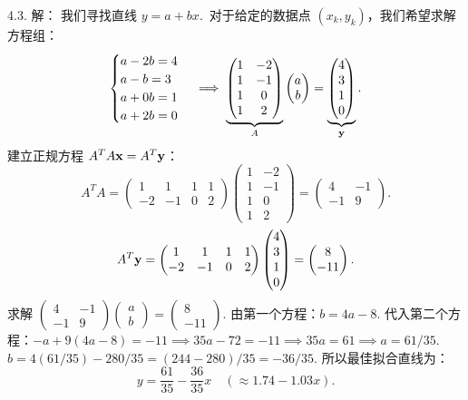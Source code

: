 \begin{exer}
4.3. 解：
我们寻找直线 $y = a + bx$.~对于给定的数据点 $(x_k, y_k)$，我们希望求解方程组：
$$
\begin{cases}
a - 2b = 4 \\
a - b = 3 \\
a + 0b = 1 \\
a + 2b = 0
\end{cases}
\implies \underbrace{\begin{pmatrix} 1 & -2 \\ 1 & -1 \\ 1 & 0 \\ 1 & 2 \end{pmatrix}}_{A} \begin{pmatrix} a \\ b \end{pmatrix} = \underbrace{\begin{pmatrix} 4 \\ 3 \\ 1 \\ 0 \end{pmatrix}}_{\mathbf{y}}.
$$
建立正规方程 $A^T A \mathbf{x} = A^T \mathbf{y}$：
$$ A^T A = \begin{pmatrix} 1 & 1 & 1 & 1 \\ -2 & -1 & 0 & 2 \end{pmatrix} \begin{pmatrix} 1 & -2 \\ 1 & -1 \\ 1 & 0 \\ 1 & 2 \end{pmatrix} = \begin{pmatrix} 4 & -1 \\ -1 & 9 \end{pmatrix}. $$
$$ A^T \mathbf{y} = \begin{pmatrix} 1 & 1 & 1 & 1 \\ -2 & -1 & 0 & 2 \end{pmatrix} \begin{pmatrix} 4 \\ 3 \\ 1 \\ 0 \end{pmatrix} = \begin{pmatrix} 8 \\ -11 \end{pmatrix}. $$
求解 $\begin{pmatrix} 4 & -1 \\ -1 & 9 \end{pmatrix} \begin{pmatrix} a \\ b \end{pmatrix} = \begin{pmatrix} 8 \\ -11 \end{pmatrix}$.
由第一个方程：$b = 4a - 8$.
代入第二个方程：$-a + 9(4a - 8) = -11 \implies 35a - 72 = -11 \implies 35a = 61 \implies a = 61/35$.
$b = 4(61/35) - 280/35 = (244 - 280)/35 = -36/35$.
所以最佳拟合直线为：
$$ y = \frac{61}{35} - \frac{36}{35}x \quad (\approx 1.74 - 1.03x). $$


\end{exer}
